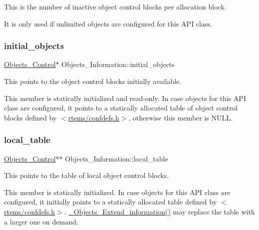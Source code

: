 This is the number of inactive object control blocks per allocation block. 

It is only used if unlimited objects are configured for this A\+PI class. \mbox{\label{structObjects__Information_a2fd8dfa896cce1535cb3fd890c7c4d84}} 
\subsubsection{\texorpdfstring{initial\_objects}{initial\_objects}}
{\footnotesize\ttfamily \mbox{\hyperlink{structObjects__Control}{Objects\+\_\+\+Control}}$\ast$ Objects\+\_\+\+Information\+::initial\+\_\+objects}



This points to the object control blocks initially available. 

This member is statically initialized and read-\/only. In case objects for this A\+PI class are configured, it points to a statically allocated table of object control blocks defined by $<$\mbox{\hyperlink{confdefs_8h}{rtems/confdefs.\+h}}$>$, otherwise this member is N\+U\+LL. \mbox{\label{structObjects__Information_a50defdb521eb333efa15a2c3d88a8306}} 
\subsubsection{\texorpdfstring{local\_table}{local\_table}}
{\footnotesize\ttfamily \mbox{\hyperlink{structObjects__Control}{Objects\+\_\+\+Control}}$\ast$$\ast$ Objects\+\_\+\+Information\+::local\+\_\+table}



This points to the table of local object control blocks. 

This member is statically initialized. In case objects for this A\+PI class are configured, it initially points to a statically allocated table defined by $<$\mbox{\hyperlink{confdefs_8h}{rtems/confdefs.\+h}}$>$. \mbox{\hyperlink{group__RTEMSScoreObject_gaf7d69e3b4cf8305b8f880a8362024fb8}{\+\_\+\+Objects\+\_\+\+Extend\+\_\+information()}} may replace the table with a larger one on demand. \mbox{\label{structObjects__Information_a4f4f5708f3462a8231a2d5061fde16ca}} 
